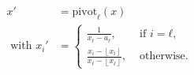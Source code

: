 \documentclass[aspectratio=169]{beamer}
\newcommand\floor[1]{\left\lfloor#1\right\rfloor}
\begin{document}
\begin{frame}[fragile]
\begin{columns}
\begin{center}
    \end{center}
    \begin{align*}
      x' & = \mathrm{pivot}_ℓ(x) \\
      \text{ with } x_i' & =
      \begin{cases}
        \frac{1}{x_ℓ - a_ℓ}, & \text{ if } i = ℓ, \\
        \frac{x_i - \floor{x_i}}{x_ℓ - \floor{x_ℓ}}, & \text{ otherwise}.
      \end{cases}
    \end{align*}
  \end{columns}
\end{frame}
\end{document}
